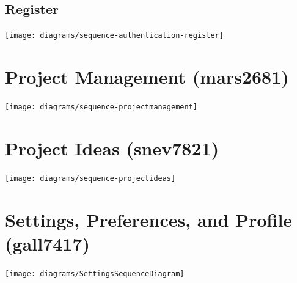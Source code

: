 \documentclass[11pt]{report}
\begin{document}
    \subsection{Register}
        \begin{minipage}{1\textwidth}
            \begin{center}
                \texttt{[image: diagrams/sequence-authentication-register]}
            \end{center}
        \end{minipage}
    
\section{Project Management (mars2681)}
    \begin{minipage}{1\textwidth}
        \begin{center}
            \texttt{[image: diagrams/sequence-projectmanagement]}
        \end{center}
    \end{minipage}
    
\section{Project Ideas (snev7821)}
    \begin{minipage}{1\textwidth}
        \begin{center}
            \texttt{[image: diagrams/sequence-projectideas]}
        \end{center}
    \end{minipage}
    
\section{Settings, Preferences, and Profile (gall7417)}
    \begin{minipage}{1\textwidth}
        \begin{center}
            \texttt{[image: diagrams/SettingsSequenceDiagram]}
        \end{center}
    \end{minipage}
    
\end{document}
